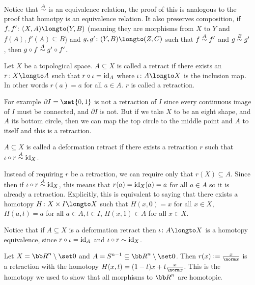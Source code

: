 Notice that $\buildrel A\over\sim$ is an equivalence relation, the proof of this is analogous to the proof that homotpy is an equivalence relation.
It also preserves composition, if $f,f'\colon(X,A)\longto(Y,B)$ (meaning they are morphisms from $X$ to $Y$ and $f(A),f'(A)\subseteq B$) and $g,g'\colon(Y,B)\longto(Z,C)$ such that $f\buildrel A\over\sim f'$
and $g\buildrel B\over\sim g'$, then $g\circ f\buildrel A\over\sim g'\circ f'$.

\bdefn

    Let $X$ be a topological space.
    $A\subseteq X$ is called a {\emphcolor retract} if there exists an $r\colon X\longto A$ such that $r\circ\iota={\rm id}_A$ where $\iota\colon A\longto X$ is the inclusion map.
    In other words $r(a)=a$ for all $a\in A$.
    $r$ is called a {\emphcolor retraction}.

\edefn

For example $\partial I=\set{0,1}$ is not a retraction of $I$ since every continuous image of $I$ must be connected, and $\partial I$ is not.
But if we take $X$ to be an eight shape, and $A$ its bottom circle, then we can map the top circle to the middle point and $A$ to itself and this is a retraction.

\bdefn

    $A\subseteq X$ is called a {\emphcolor deformation retract} if there exists a retraction $r$ such that $\iota\circ r\buildrel A\over\sim{\rm id}_X$.

\edefn

Instead of requiring $r$ be a retraction, we can require only that $r(X)\subseteq A$.
Since then if $\iota\circ r\buildrel A\over\sim{\rm id}_X$, this means that $r(a)={\rm id}_X(a)=a$ for all $a\in A$ so it is already a retraction.
Explicitly, this is equivalent to saying that there exists a homotopy $H\colon X\times I\longto X$ such that $H(x,0)=x$ for all $x\in X$, $H(a,t)=a$ for all $a\in A,t\in I$, $H(x,1)\in A$ for all $x\in X$.

Notice that if $A\subseteq X$ is a deformation retract then $\iota\colon A\longto X$ is a homotopy equivalence, since $r\circ\iota={\rm id}_A$ and $\iota\circ r\sim{\rm id}_X$.

\bexam

    Let $X={\bb R}^n\setminus\set0$ and $A=S^{n-1}\subseteq{\bb R}^n\setminus\set0$.
    Then $r(x)\coloneqq\frac x{\norm x}$ is a retraction with the homotopy $H(x,t)=(1-t)x+t\frac x{\norm x}$.
    This is the homotopy we used to show that all morphisms to ${\bb R}^n$ are homotopic.

